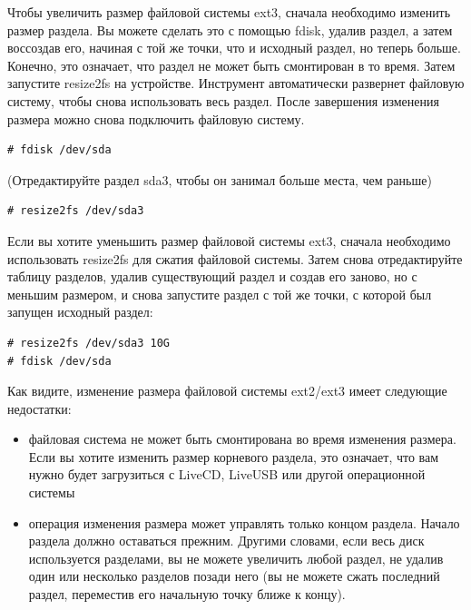 \documentclass[10pt]{book}
\begin{document}
Чтобы увеличить размер файловой системы ext3, сначала необходимо изменить размер раздела. Вы можете сделать это с помощью fdisk, удалив раздел, а затем воссоздав его, начиная с той же точки, что и исходный раздел, но теперь больше. Конечно, это означает, что раздел не может быть смонтирован в то время. Затем запустите resize2fs на устройстве. Инструмент автоматически развернет файловую систему, чтобы снова использовать весь раздел. После завершения изменения размера можно снова подключить файловую систему.

\begin{tcolorbox} 
\begin{lstlisting}
# fdisk /dev/sda
\end{lstlisting}
\end{tcolorbox}

(Отредактируйте раздел sda3, чтобы он занимал больше места, чем раньше)

\begin{tcolorbox} 
\begin{lstlisting}
# resize2fs /dev/sda3
\end{lstlisting}
\end{tcolorbox}

Если вы хотите уменьшить размер файловой системы ext3, сначала необходимо использовать resize2fs для сжатия файловой системы. Затем снова отредактируйте таблицу разделов, удалив существующий раздел и создав его заново, но с меньшим размером, и снова запустите раздел с той же точки, с которой был запущен исходный раздел:

\begin{tcolorbox} 
\begin{lstlisting}
# resize2fs /dev/sda3 10G
# fdisk /dev/sda
\end{lstlisting}
\end{tcolorbox}

Как видите, изменение размера файловой системы ext2/ext3 имеет следующие недостатки:

\begin{itemize} 
\item файловая система не может быть смонтирована во время изменения размера. Если вы хотите изменить размер корневого раздела, это означает, что вам нужно будет загрузиться с LiveCD, LiveUSB или другой операционной системы
\item операция изменения размера может управлять только концом раздела. Начало раздела должно оставаться прежним. Другими словами, если весь диск используется разделами, вы не можете увеличить любой раздел, не удалив один или несколько разделов позади него (вы не можете сжать последний раздел, переместив его начальную точку ближе к концу).
\end{itemize}
\end{document}
